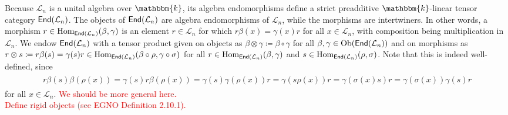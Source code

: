 \noindent Because $\mathcal{L}_n$ is a unital algebra over $\mathbbm{k}$, its algebra endomorphisms define a strict preadditive $\mathbbm{k}$-linear tensor category $\textup{\textsf{End}}(\mathcal{L}_n)$. The objects of $\textup{\textsf{End}}(\mathcal{L}_n)$ are algebra endomorphisms of $\mathcal{L}_n$, while the morphisms are intertwiners. In other words, a morphism $r \in \textup{Hom}_{\textup{\textsf{End}}(\mathcal{L}_n)}(\beta, \gamma)$ is an element $r \in \mathcal{L}_n$ for which $r\beta(x) = \gamma(x)r$ for all $x \in \mathcal{L}_n$, with composition being multiplication in $\mathcal{L}_n$. We endow $\textup{\textsf{End}}(\mathcal{L}_n)$ with a tensor product given on objects as $\beta \otimes \gamma \coloneqq \beta \circ \gamma$ for all $\beta, \gamma \in \textup{Ob}(\textup{\textsf{End}}(\mathcal{L}_n))$ and on morphisms as $r \otimes s \coloneqq r\beta(s) = \gamma(s)r \in \textup{Hom}_{\textup{\textsf{End}}(\mathcal{L}_n)}(\beta\circ\rho, \gamma\circ\sigma)$ for all $r \in \textup{Hom}_{\textup{\textsf{End}}(\mathcal{L}_n)}(\beta, \gamma)$ and $s \in \textup{Hom}_{\textup{\textsf{End}}(\mathcal{L}_n)}(\rho, \sigma)$. Note that this is indeed well-defined, since
\begin{align*}
\begin{split}
r\beta(s)\beta(\rho(x)) = \gamma(s)r\beta(\rho(x)) = \gamma(s)\gamma(\rho(x))r = \gamma(s\rho(x))r = \gamma(\sigma(x)s)r = \gamma(\sigma(x))\gamma(s)r
\end{split}
\end{align*}
\noindent for all $x \in \mathcal{L}_n$. \textcolor{red}{We should be more general here.}\\

\noindent\textcolor{red}{Define rigid objects (see EGNO Definition 2.10.1).}\\

